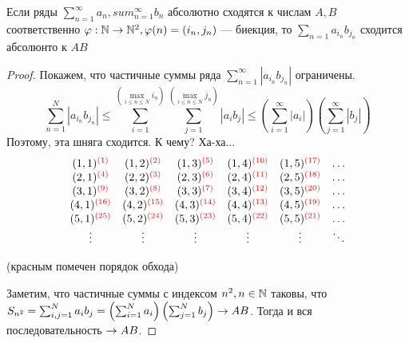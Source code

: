 \begin{theorem}[Коши]
    Если ряды \(\sum_{n = 1}^\infty a_n, sum_{n = 1}^\infty b_n\) абсолютно сходятся к числам \(A, B\) соответственно \(\varphi: \mathbb{N} \rightarrow \mathbb{N}^2, \varphi(n) = (i_n, j_n)\) --- биекция, то \(\sum_{n = 1}a_{i_n}b_{j_n}\) сходится абсолюнто к \(AB\)
\end{theorem}
\begin{proof}
    Покажем, что частичные суммы ряда \(\sum_{n = 1}^\infty |a_{i_n}b_{j_n}|\) ограничены.
    \[\sum_{n = 1}^N |a_{i_n}b_{j_n}| \le \sum_{i = 1}^{(\max_{i \le n \le N}i_n)}\sum_{j = 1}^{(\max_{i \le n \le N}j_n)} |a_ib_j| \le \left(\sum_{i = 1}^\infty |a_i|\right)\left(\sum_{j = 1}^\infty |b_j|\right)\]
    Поэтому, эта шняга сходится. К чему? Ха-ха...
    \[\begin{array}{ccccccccccc}
        (1, 1)^{\textcolor{red}{(1)}} & (1, 2)^{\textcolor{red}{(2)}} &(1, 3)^{\textcolor{red}{(5)}} & (1, 4)^{\textcolor{red}{(10)}} & (1, 5)^{\textcolor{red}{(17)}} & \dots \\
        
        (2, 1)^{\textcolor{red}{(4)}} & (2, 2)^{\textcolor{red}{(3)}} & (2, 3)^{\textcolor{red}{(6)}} & (2, 4)^{\textcolor{red}{(11)}} & (2, 5)^{\textcolor{red}{(18)}} & \dots \\
        
        (3, 1)^{\textcolor{red}{(9)}} & (3, 2)^{\textcolor{red}{(8)}} & (3, 3)^{\textcolor{red}{(7)}} & (3, 4)^{\textcolor{red}{(12)}} & (3, 5)^{\textcolor{red}{(20)}} & \dots \\
        (4, 1)^{\textcolor{red}{(16)}} & (4, 2)^{\textcolor{red}{(15)}} & (4, 3)^{\textcolor{red}{(14)}} & (4, 4)^{\textcolor{red}{(13)}} & (4, 5)^{\textcolor{red}{(19)}} & \dots \\

        (5, 1)^{\textcolor{red}{(25)}} & (5, 2)^{\textcolor{red}{(24)}} & (5, 3)^{\textcolor{red}{(23)}} & (5, 4)^{\textcolor{red}{(22)}} & (5, 5)^{\textcolor{red}{(21)}} & \dots \\
        \vdots & \vdots & \vdots & \vdots & \vdots & \ddots
    \end{array}\]
    \begin{center}
        (красным помечен порядок обхода)
    \end{center}
    Заметим, что частичные суммы с индексом \(n^2, n \in \mathbb{N}\) таковы, что \(S_{n^2} = \sum_{i, j = 1}^Na_ib_j = \left(\sum_{i = 1}^N a_i\right)\left(\sum_{j = 1}^N b_j\right) \rightarrow AB\). Тогда и вся последовательность \(\rightarrow AB\).
\end{proof}

